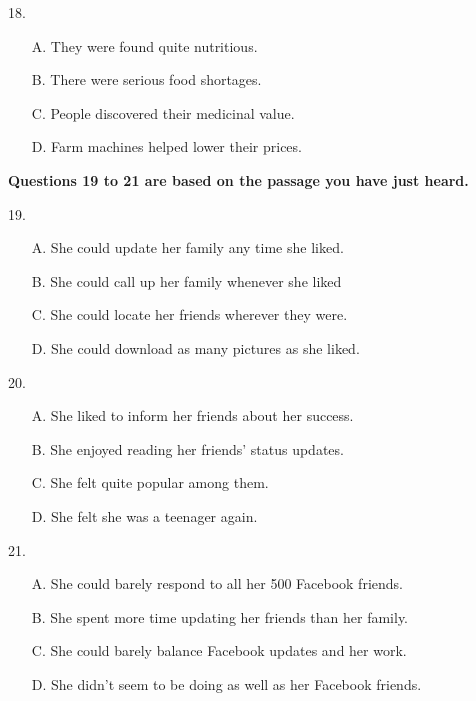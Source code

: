 \documentclass[UTF8,11pt]{ctexart}
\begin{document}
18.


\begin{itemize}[leftmargin=2em,itemsep=.2em,topsep=.4em]\item[A.] They were found quite nutritious.
\item[B.] There were serious food shortages.
\item[C.] People discovered their medicinal value.
\item[D.] Farm machines helped lower their prices.
\end{itemize}

\textbf{Questions 19 to 21 are based on the passage you have just heard.}


19.


\begin{itemize}[leftmargin=2em,itemsep=.2em,topsep=.4em]\item[A.] She could update her family any time she liked.
\item[B.] She could call up her family whenever she liked
\item[C.] She could locate her friends wherever they were.
\item[D.] She could download as many pictures as she liked.
\end{itemize}

20.


\begin{itemize}[leftmargin=2em,itemsep=.2em,topsep=.4em]\item[A.] She liked to inform her friends about her success.
\item[B.] She enjoyed reading her friends’ status updates.
\item[C.] She felt quite popular among them.
\item[D.] She felt she was a teenager again.
\end{itemize}

21.


\begin{itemize}[leftmargin=2em,itemsep=.2em,topsep=.4em]\item[A.] She could barely respond to all her 500 Facebook friends.
\item[B.] She spent more time updating her friends than her family.
\item[C.] She could barely balance Facebook updates and her work.
\item[D.] She didn’t seem to be doing as well as her Facebook friends.
\end{itemize}
\end{document}
